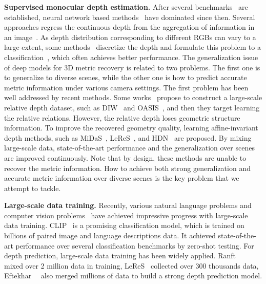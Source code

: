 \noindent\textbf{Supervised monocular depth estimation.}
After several benchmarks~\cite{silberman2012indoor, Geiger2013IJRR} are established, neural network based
methods~\cite{yuan2022new, Yin2019enforcing, bhat2021adabins} have dominated since then. Several approaches regress the continuous depth from the aggregation of information in an image~\cite{eigen2014depth}. As depth distribution corresponding to different RGBs can vary to a large extent, some methods~\cite{Yin2019enforcing, 
bhat2021adabins}
discretize the depth and formulate this problem to a classification~\cite{yin2021virtual},  
which often achieves better performance. %
The generalization issue of deep models for 3D metric recovery   
is related to two problems. 
The first one is to generalize to diverse scenes, while 
the other 
one is how to predict accurate metric information under various camera settings. The first problem has been well addressed by recent methods. Some works~\cite{
xian2020structure, xian2018monocular, yin2021virtual} propose to construct a large-scale relative depth dataset, such as DIW~\cite{chen2016single} and OASIS~\cite{chen2020oasis}, and then they target learning the relative relations. However, the relative depth loses geometric structure information.
To improve the recovered geometry quality, 
learning affine-invariant depth methods, such as MiDaS~\cite{Ranftl2020}, LeReS~\cite{leres}, and HDN~\cite{ 
zhang2022hierarchical} are proposed. 
By mixing large-scale data, 
state-of-the-art performance and the generalization over scenes are improved continuously. 
Note that by design, these methods are unable to recover 
the metric information.
How to achieve both strong generalization and accurate metric information over diverse scenes is the key problem that
we attempt to tackle. 

\noindent\textbf{Large-scale data training.}
Recently, various natural language problems and computer vision problems~\cite{
yin2022devil, radford2021learning, lambert2020mseg} have achieved impressive progress with large-scale data training. CLIP~\cite{radford2021learning} is a promising classification model, which is trained on billions of paired image and language descriptions data. It achieved state-of-the-art performance over several classification benchmarks by zero-shot testing. 
For depth prediction, large-scale data training has been widely applied. Ranft~\etal~\cite{Ranftl2020} mixed over 2 million data in training, LeReS~\cite{yin2022towards} collected over $300$ thousands data, Eftekhar~\etal~\cite{eftekhar2021omnidata} also merged millions of data to build a strong depth prediction model. %





